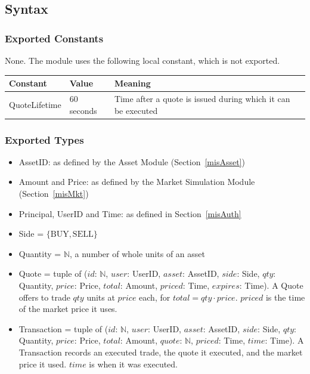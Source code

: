\documentclass[12pt, titlepage]{article}
\begin{document}
\subsection{Syntax}

\subsubsection{Exported Constants}

None. The module uses the following local constant, which is not exported.

\begin{center}
\renewcommand{\arraystretch}{1.2}
\begin{tabular}{l l >{\raggedright\arraybackslash}p{7cm}}
\toprule
\textbf{Constant} & \textbf{Value} & \textbf{Meaning}\\
\midrule
\textsf{QuoteLifetime} & 60 seconds & Time after a quote is issued during
  which it can be executed\\
\bottomrule
\end{tabular}
\end{center}

\subsubsection{Exported Types}

\begin{itemize}
\item AssetID: as defined by the Asset Module (Section~\ref{misAsset})
\item Amount and Price: as defined by the Market Simulation Module
  (Section~\ref{misMkt})
\item Principal, UserID and Time: as defined in Section~\ref{misAuth}
\item Side = $\{\mathrm{BUY}, \mathrm{SELL}\}$
\item Quantity = $\mathbb{N}$, a number of whole units of an asset
\item Quote = tuple of ($\mathit{id}$: $\mathbb{N}$, $\mathit{user}$:
  UserID, $\mathit{asset}$: AssetID, $\mathit{side}$: Side, $\mathit{qty}$:
  Quantity, $\mathit{price}$: Price, $\mathit{total}$: Amount,
  $\mathit{priced}$: Time, $\mathit{expires}$: Time). A Quote offers to
  trade $\mathit{qty}$ units at $\mathit{price}$ each, for $\mathit{total}
  = \mathit{qty} \cdot \mathit{price}$. $\mathit{priced}$ is the time of the
  market price it uses.
\item Transaction = tuple of ($\mathit{id}$: $\mathbb{N}$, $\mathit{user}$:
  UserID, $\mathit{asset}$: AssetID, $\mathit{side}$: Side, $\mathit{qty}$:
  Quantity, $\mathit{price}$: Price, $\mathit{total}$: Amount,
  $\mathit{quote}$: $\mathbb{N}$, $\mathit{priced}$: Time, $\mathit{time}$:
  Time). A Transaction records an executed trade, the quote it executed, and
  the market price it used. $\mathit{time}$ is when it was executed.
\end{itemize}
\end{document}
